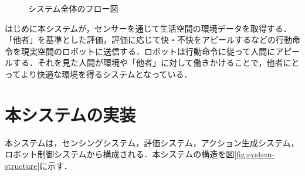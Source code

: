 \documentclass[paper=a4paper,jafontsize=9pt,head_space=15mm,gutter=20mm,
twocolumn,number_of_lines=49, line_length=26zw]{myuarticle}
\begin{document}
\fboxsep=0pt            %
\fboxrule=1pt            %
\begin{figure}[h]
  \centering
  \caption{システム全体のフロー図}
  \label{fig:system-flow}
\end{figure}

はじめに本システムが，センサーを通じて生活空間の環境データを取得する．「他者」を基準とした評価，評価に応じて快・不快をアピールするなどの行動命令を現実空間のロボットに送信する．ロボットは行動命令に従って人間にアピールする．それを見た人間が環境や「他者」に対して働きかけることで，他者にとってより快適な環境を得るシステムとなっている．

\section{本システムの実装}
本システムは，センシングシステム，評価システム，アクション生成システム，ロボット制御システムから構成される．本システムの構造を図\ref{fig:system-structure}に示す．
\end{document}
